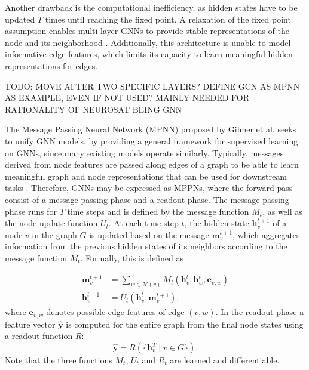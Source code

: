 Another drawback is the computational inefficiency, as hidden states have to be updated $T$ times until reaching the fixed point. A relaxation of the fixed point assumption enables multi-layer GNNs to provide stable representations of the node and its neighborhood \cite{li2015gated}. Additionally, this architecture is unable to model informative edge features, which limits its capacity to learn meaningful hidden representations for edges.


TODO: MOVE AFTER TWO SPECIFIC LAYERS? DEFINE GCN AS MPNN AS EXAMPLE, EVEN IF NOT USED? MAINLY NEEDED FOR RATIONALITY OF NEUROSAT BEING GNN

The Message Passing Neural Network (MPNN) proposed by Gilmer et al. \cite{gilmer2017neural} seeks to unify GNN models, by providing a general framework for supervised learning on GNNs, since many existing models operate similarly. Typically, messages derived from node features are passed along edges of a graph to be able to learn meaningful graph and node representations that can be used for downstream tasks \cite{kipf2016semi} \cite{4700287} \cite{velivckovic2017graph} \cite{xu2018powerful}. Therefore, GNNs may be expressed as MPPNs, where the forward pass consist of a message passing phase and a readout phase. The message passing phase runs for $T$ time steps and is defined by the message function $M_t$, as well as the node update function $U_t$. At each time step $t$, the hidden state $\mathbf{h}_v^{t+1}$ of a node $v$ in the graph $G$ is updated based on the message $\mathbf{m}_v^{t+1}$, which aggregates information from the previous hidden states of its neighbors according to the message function $M_t$. Formally, this is defined as

\begin{align}
    \mathbf{m}_v^{t+1} &= \sum_{w \in \mathcal{N}(v)} M_t\left(\mathbf{h}_v^t, \mathbf{h}_w^t, \mathbf{e}_{v,w}\right) \tag{1} \\
    \mathbf{h}_v^{t+1} &= U_t\left(\mathbf{h}_v^t, \mathbf{m}_v^{t+1}\right) \tag{2},
\end{align}
where $\mathbf{e}_{v,w}$ denotes possible edge features of edge $(v,w)$.
In the readout phase a feature vector $\hat{\mathbf{y}}$ is computed for the entire graph from the final node states  using a readout function $R$:
\begin{equation}
    \hat{\mathbf{y}} = R\left(\{ \mathbf{h}_v^T \mid v \in G \}\right) \tag{3}.
\end{equation}
Note that the three functions $M_t$, $U_t$ and $R_t$ are learned and differentiable.
    
